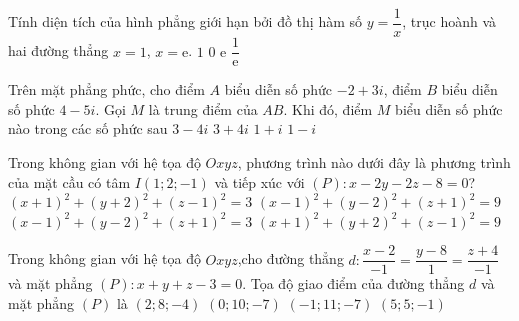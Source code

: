 \begin{ex}%
	Tính diện tích của hình phẳng giới hạn bởi đồ thị hàm số $y=\dfrac{1}{x}$, trục hoành và hai đường thẳng $x=1$, $x=\mathrm{e}$.
	\choice
	{\True $1$}
	{$0$}
	{$\mathrm{e}$}
	{$\dfrac{1}{\mathrm{e}}$}
\end{ex}

\begin{ex}%
	Trên mặt phẳng phức, cho điểm $A$ biểu diễn số phức $-2+3i$, điểm $B$ biểu diễn số phức $4-5i$. Gọi $M$ là trung điểm của $AB$. Khi đó, điểm $M$ biểu diễn số phức nào trong các số phức sau
	\choice
	{$3-4i$}
	{$3+4i$}
	{$1+i$}
	{\True $1-i$}
\end{ex}

\begin{ex}%
	Trong không gian với hệ tọa độ $Oxyz$, phương trình nào dưới đây là phương trình của mặt cầu có tâm $I(1;2;-1)$ và tiếp xúc với $(P)\colon x-2y-2z-8=0$?
	\choice
	{$(x+1)^2+(y+2)^2+(z-1)^2=3$}
	{\True $(x-1)^2+(y-2)^2+(z+1)^2=9$}
	{$(x-1)^2+(y-2)^2+(z+1)^2=3$}
	{$(x+1)^2+(y+2)^2+(z-1)^2=9$}
\end{ex}

\begin{ex}%
	Trong không gian với hệ tọa độ $Oxyz$,cho đường thẳng $d\colon \dfrac{x-2}{-1} =\dfrac{y-8}{1} =\dfrac{z+4}{-1}$ và mặt phẳng $(P)\colon x+y+z-3=0$. Tọa độ giao điểm của đường thẳng $d$ và mặt phẳng $(P)$ là
	\choice
	{$(2;8;-4)$}
	{$(0;10;-7)$}
	{\True $(-1;11;-7)$}
	{$(5;5;-1)$}
\end{ex}

